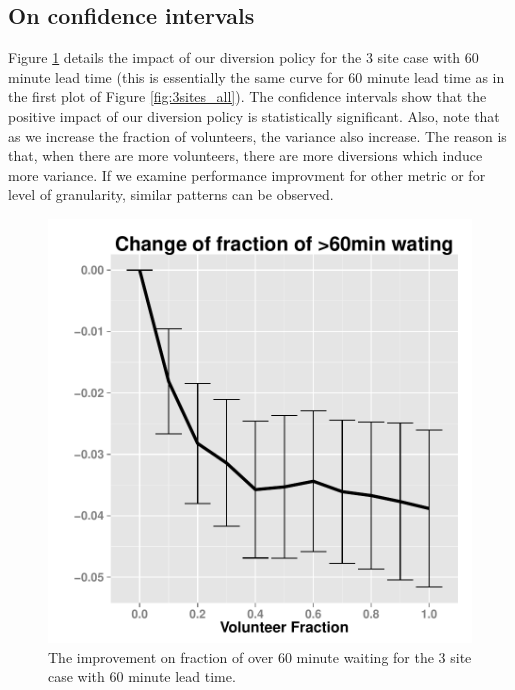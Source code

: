 \subsection{On confidence intervals}

Figure \ref{fig:ci} details the impact of our diversion policy for the 3 site
case with 60 minute lead time (this is essentially the same
curve for 60 minute lead time as in the first plot of Figure
\ref{fig:3sites_all}). The confidence intervals show that
the positive impact of our diversion policy is statistically
significant. Also, note that as we increase the fraction of
volunteers, the variance also increase. The reason is that,
when there are more volunteers, there are more diversions which
induce more variance. If we examine performance improvment
for other metric or for level of granularity, similar patterns
can be observed.

\begin{figure}[htp]
\centering
\includegraphics[width=.95\textwidth]{chap3/numeric/pic/ci}
\caption{The improvement on fraction of over 60 minute waiting
for the 3 site case with 60 minute lead time.}
\label{fig:ci}
\end{figure}
